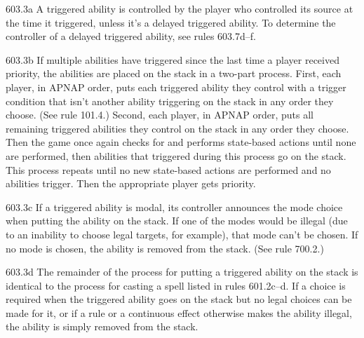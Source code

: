 603.3a A triggered ability is controlled by the player who controlled its source at the time it triggered, unless it’s a delayed triggered ability. To determine the controller of a delayed triggered ability, see rules 603.7d–f.

603.3b If multiple abilities have triggered since the last time a player received priority, the abilities are placed on the stack in a two-part process. First, each player, in APNAP order, puts each triggered ability they control with a trigger condition that isn’t another ability triggering on the stack in any order they choose. (See rule 101.4.) Second, each player, in APNAP order, puts all remaining triggered abilities they control on the stack in any order they choose. Then the game once again checks for and performs state-based actions until none are performed, then abilities that triggered during this process go on the stack. This process repeats until no new state-based actions are performed and no abilities trigger. Then the appropriate player gets priority.

603.3c If a triggered ability is modal, its controller announces the mode choice when putting the ability on the stack. If one of the modes would be illegal (due to an inability to choose legal targets, for example), that mode can’t be chosen. If no mode is chosen, the ability is removed from the stack. (See rule 700.2.)

603.3d The remainder of the process for putting a triggered ability on the stack is identical to the process for casting a spell listed in rules 601.2c–d. If a choice is required when the triggered ability goes on the stack but no legal choices can be made for it, or if a rule or a continuous effect otherwise makes the ability illegal, the ability is simply removed from the stack.

